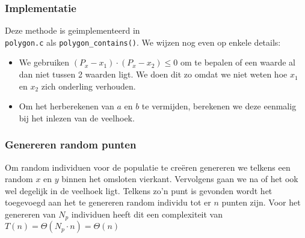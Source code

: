 
\subsubsection{Implementatie}
Deze methode is geimplementeerd in \\ \texttt{polygon.c} als  \texttt{polygon\_contains()}. 
We wijzen nog even op enkele details:
\begin{itemize}
\item We gebruiken $(P_x-x_1)\cdot(P_x-x_2)\leq0$ om te bepalen of een waarde al dan niet 
		tussen 2 waarden ligt. We doen dit zo omdat we niet weten hoe $x_1$ en $x_2$ 
		zich onderling verhouden.
\item Om het herberekenen van $a$ en $b$ te vermijden, berekenen we deze eenmalig bij het inlezen van de veelhoek.
\end{itemize}

\subsubsection{Genereren random punten}
\label{ssub:rand_generation}
Om random individuen voor de populatie te creëren genereren we telkens een random $x$ en $y$ binnen het omsloten vierkant. Vervolgens gaan we na of het ook wel degelijk in de veelhoek ligt. Telkens zo'n punt is gevonden wordt het toegevoegd aan het te genereren random individu tot er $n$ punten zijn. Voor het genereren van $N_p$ individuen heeft dit een complexiteit van $T(n)=\Theta(N_p\cdot n) = \Theta(n)$


 
